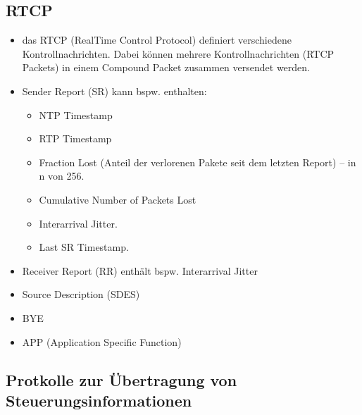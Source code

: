 \documentclass{article} %
\begin{document}
\subsection{RTCP}
	\begin{itemize}
	\item das RTCP (RealTime Control Protocol)  definiert verschiedene Kontrollnachrichten. Dabei können mehrere Kontrollnachrichten (RTCP Packets) in einem Compound Packet zusammen versendet werden. 
	\item Sender Report (SR) kann bspw. enthalten:
		\begin{itemize}
			\item NTP Timestamp 
			\item RTP Timestamp 
			\item Fraction Lost (Anteil der verlorenen Pakete seit dem letzten Report) – in n von 256. 
			\item Cumulative Number of Packets Lost 
			\item Interarrival Jitter. 
			\item Last SR Timestamp. 
		\end{itemize}
	\item Receiver Report (RR) enthält bspw. Interarrival Jitter
	\item Source Description (SDES)
	\item BYE
	\item APP (Application Specific Function)
	\end{itemize}

\subsection{Protkolle zur Übertragung von Steuerungsinformationen}	
\end{document}
